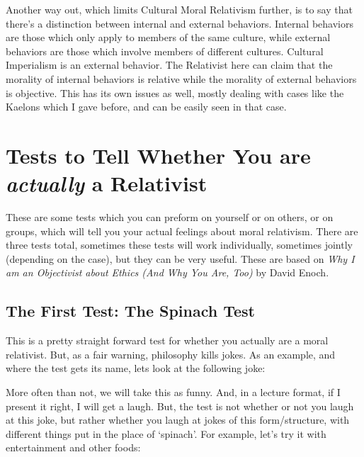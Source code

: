 Another way out, which limits Cultural Moral Relativism further, is to say that there's a distinction between internal and external behaviors. Internal behaviors are those which only apply to members of the same culture, while external behaviors are those which involve members of different cultures. Cultural Imperialism is an external behavior. The Relativist here can claim that the morality of internal behaviors is relative while the morality of external behaviors is objective. This has its own issues as well, mostly dealing with cases like the Kaelons which I gave before, and can be easily seen in that case. 

\section{Tests to Tell Whether You are \emph{actually} a Relativist}
These are some tests which you can preform on yourself or on others, or on groups, which will tell you your actual feelings about moral relativism. There are three tests total, sometimes these tests will work individually, sometimes jointly (depending on the case), but they can be very useful. These are based on \emph{Why I am an Objectivist about Ethics (And Why You Are, Too)} 
by David Enoch\autocite{Enoch1}.

\subsection{The First Test: The Spinach Test}

This is a pretty straight forward test for whether you actually are a moral relativist. But, as a fair warning, philosophy kills jokes. As an example, and where the test gets its name, lets look at the following joke:


More often than not, we will take this as funny. And, in a lecture format, if I present it right, I will get a laugh. But, the test is not whether or not you laugh at this joke, but rather whether you laugh at jokes of this form/structure, with different things put in the place of `spinach'. For example, let's try it with entertainment and other foods:


